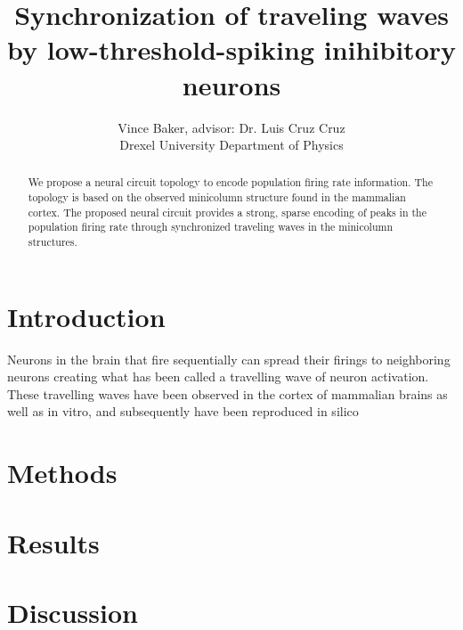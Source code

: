 \documentclass[a4paper,11pt]{article}
\title{Synchronization of traveling waves by low-threshold-spiking inihibitory neurons}
\author{Vince Baker, advisor: Dr. Luis Cruz Cruz\\ Drexel University Department of Physics}
\begin{document}
\maketitle

\begin{abstract}
We propose a neural circuit topology to encode population firing rate information.
The topology is based on the observed minicolumn structure found in the mammalian cortex.
The proposed neural circuit provides a strong, sparse encoding of peaks in the population firing rate through synchronized traveling waves in the minicolumn structures.
\end{abstract}

\section{Introduction} 

Neurons in the brain that fire sequentially can spread their firings to neighboring neurons creating what has been called a travelling wave of neuron activation. 
These travelling waves have been observed in the cortex of mammalian brains as well as in vitro, and subsequently have been reproduced in silico \cite{keane2015}

\section{Methods}

\section{Results}


\section{Discussion}


\clearpage
\printbibliography
\end{document}

